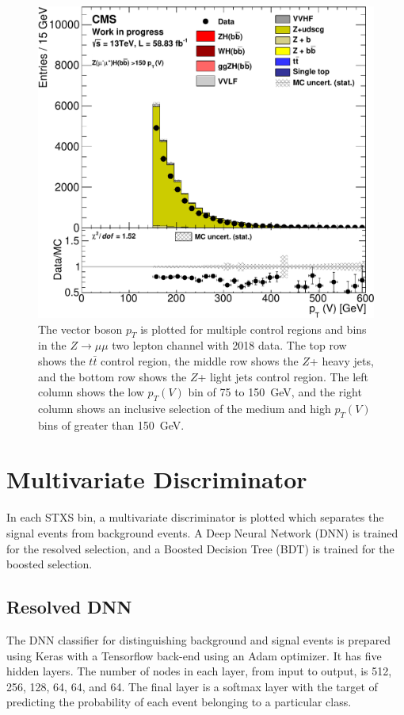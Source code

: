 \begin{figure}
  \includegraphics[width=0.42\linewidth]{figures/2018_Zmm/Zlf_medhigh_Zmm__Vpt_.pdf}
  \caption[Control region plots for two muons in 2018]{
    The vector boson $p_T$ is plotted for multiple control regions and bins in
    the $Z\rightarrow \mu\mu$ two lepton channel with 2018 data.
    The top row shows the $t\bar{t}$ control region,
    the middle row shows the $Z$+ heavy jets,
    and the bottom row shows the $Z$+ light jets control region.
    The left column shows the low $p_T(V)$ bin of 75 to \SI{150}{GeV},
    and the right column shows an inclusive selection of
    the medium and high $p_T(V)$ bins of greater than \SI{150}{GeV}.
  }
  \label{fig:2018_Zmm_vpt}
\end{figure}

\section{Multivariate Discriminator}

In each STXS bin, a multivariate discriminator is plotted which separates
the signal events from background events.
A Deep Neural Network (DNN) is trained for the resolved selection,
and a Boosted Decision Tree (BDT) is trained for the boosted selection.

\subsection{Resolved DNN}

The DNN classifier for distinguishing background and signal events is prepared using
Keras with a Tensorflow back-end using an Adam optimizer.
It has five hidden layers.
The number of nodes in each layer, from input to output, is 512, 256, 128, 64, 64, and 64.
The final layer is a softmax layer with the target of predicting the probability
of each event belonging to a particular class.

